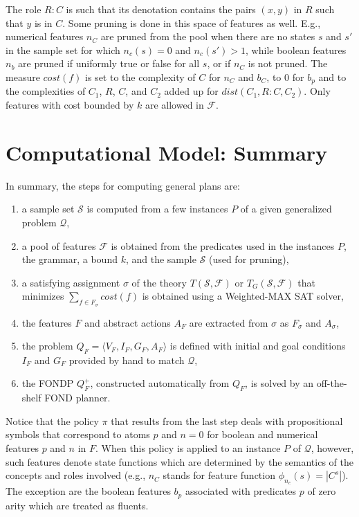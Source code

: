 \documentclass[letterpaper]{article} %
\newcommand{\tup}[1]{\langle #1 \rangle}
\newcommand{\Q}{\mathcal{Q}}
\newcommand{\F}{\mathcal{F}}
\renewcommand{\S}{\mathcal{S}}
\begin{document}
The role $R:C$ is such that its denotation contains the pairs $(x,y)$ in $R$
such that $y$ is in $C$.
Some pruning is done in this space of features as well. E.g., numerical
features $n_C$ are pruned from the pool when there are no states $s$ and $s'$
in the sample set for which $n_c(s)=0$ and $n_c(s') > 1$, while boolean
features $n_b$ are pruned if uniformly true or false for all $s$, or if $n_C$
is not pruned. 
The measure $cost(f)$ is set to the complexity of $C$ for $n_C$ and $b_C$,
to $0$ for $b_p$ and to the complexities of $C_1$, $R$, $C$, and $C_2$ added
up for $\textit{dist}(C_1,R:C,C_2)$.
Only features with cost bounded by $k$ are allowed in $\F$.


\section{Computational Model: Summary}

In summary, the steps for computing general plans are:
\begin{enumerate}[1.]
  \item a sample set $\S$ is computed from a few instances $P$ of a given
    generalized problem $\Q$,
  \item a pool of features $\F$ is obtained from the predicates used in the
    instances $P$, the grammar, a  bound $k$, and the sample $\S$ (used for
    pruning),
  \item a satisfying assignment $\sigma$ of the theory $T(\S,\F)$ or $T_G(\S,\F)$
    that minimizes $\sum_{f \in F_{\sigma}} cost(f)$ is obtained using a
    Weighted-MAX SAT solver,
  \item the features $F$ and abstract actions $A_F$ are extracted from $\sigma$
    as $F_{\sigma}$ and $A_{\sigma}$,
  \item the problem $Q_F=\tup{V_F,I_F,G_F,A_F}$ is defined with initial and goal
    conditions $I_F$ and $G_F$ provided by hand to match $\Q$, 
  \item the FONDP $Q^+_F$, constructed automatically from $Q_F$, is solved by an off-the-shelf
    FOND planner.
\end{enumerate}

Notice that the policy $\pi$ that results from the last step deals with
propositional symbols that correspond to atoms $p$ and $n=0$ for boolean
and numerical features $p$ and $n$ in $F$.
When this policy is applied to an instance $P$ of $\Q$, however, such features denote state functions
which are determined by the  semantics of the concepts and roles involved
(e.g., $n_C$ stands for feature function $\phi_{n_c}(s)=|C^s|$).
The exception are the boolean features $b_p$ associated with
predicates $p$ of zero arity which are treated as fluents.
\end{document}
